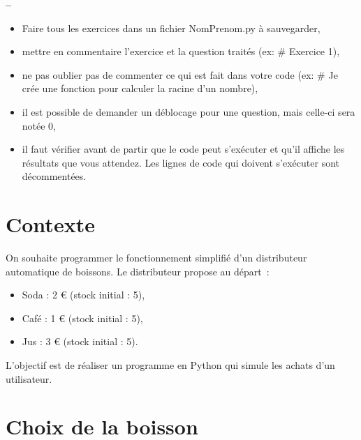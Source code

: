 

\begin{center}
{\Large\bf {\type} \no {\numero} -- \descrip}
\end{center}


\begin{boxedminipage}{.9\textwidth} 
\begin{itemize}
 \item Faire tous les exercices dans un fichier {NomPrenom.py} à sauvegarder,
 \item mettre en commentaire l'exercice et la question traités (ex: \# Exercice 1),
 \item ne pas oublier pas de commenter ce qui est fait dans votre code (ex: \# Je crée une fonction pour calculer la racine d'un nombre),
 \item il est possible de demander un déblocage pour une question, mais celle-ci sera notée 0,
 \item il faut vérifier avant de partir que le code peut s'exécuter et qu'il affiche les résultats que vous attendez. Les lignes de code qui doivent s'exécuter sont décommentées.
\end{itemize}
\end{boxedminipage}


\section*{Contexte}
On souhaite programmer le fonctionnement simplifié d’un distributeur automatique de boissons.  
Le distributeur propose au départ~:
\begin{itemize}
    \item Soda : 2 € (stock initial : 5),
    \item Café : 1 € (stock initial : 5),
    \item Jus : 3 € (stock initial : 5).
\end{itemize}

\bigskip
L’objectif est de réaliser un programme en Python qui simule les achats d’un utilisateur.  

\section{Choix de la boisson}

